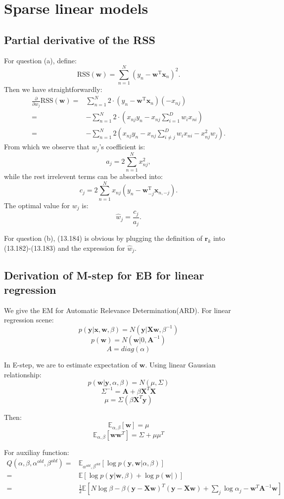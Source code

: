 \documentclass[UTF8]{ctexart}
\begin{document}
\newpage
\section{Sparse linear models}
\subsection{Partial derivative of the RSS}
For question (a), define:
$$\text{RSS}(\textbf{w})=\sum_{n=1}^{N}(y_{n}-\textbf{w}^{\text{T}}\textbf{x}_{n})^{2}.$$
Then we have straightforwardly:
\begin{align}
\frac{\partial}{\partial w_{j}}\text{RSS}(\textbf{w})=&\sum_{n=1}^{N}2\cdot(y_{n}-\textbf{w}^{\text{T}}\textbf{x}_{n})(-x_{nj})\nonumber \\
=&-\sum_{n=1}^{N}2\cdot(x_{nj}y_{n}-x_{nj}\sum_{i=1}^{D}w_{i}x_{ni})\nonumber \\
=&-\sum_{n=1}^{N}2(x_{nj}y_{n}-x_{nj}\sum_{i\neq j}^{D}w_{i}x_{ni}-x_{nj}^{2}w_{j}).\nonumber
\end{align}
From which we observe that $w_{j}$'s coefficient is:
$$a_{j}=2\sum_{n=1}^{N}x_{nj}^{2},$$
while the rest irrelevent terms can be absorbed into:
$$c_{j}=2\sum_{n=1}^{N}x_{nj}(y_{n}-\textbf{w}_{-j}^{\text{T}}\textbf{x}_{n,-j}).$$
The optimal value for $w_{j}$ is:
$$\hat{w}_{j}=\frac{c_{j}}{a_{j}}.$$

For question (b), (13.184) is obvious by plugging the definition of $\textbf{r}_{k}$ into (13.182)-(13.183) and the expression for $\hat{w}_{j}$.


\subsection{Derivation of M-step for EB for linear regression}
We give the EM for Automatic Relevance Determination(ARD). For linear regression scene:
$$p(\textbf{y}|\textbf{x},\textbf{w},\beta)=N(\textbf{y}|\textbf{X}\textbf{w},\beta^{-1})$$
$$p(\textbf{w})=N(\textbf{w}|0,\textbf{A}^{-1})$$
$$A=diag(\alpha)$$

In E-step, we are to estimate expectation of $\textbf{w}$. Using linear Gaussian relationship:
$$p(\textbf{w}|\textbf{y},\alpha,\beta)=N(\mu,\Sigma)$$
$$\Sigma^{-1}=\textbf{A}+\beta \textbf{X}^{T}\textbf{X}$$
$$\mu=\Sigma(\beta \textbf{X}^{T}\textbf{y})$$

Then:
$$\mathbb{E}_{\alpha,\beta}[\textbf{w}]=\mu$$
$$\mathbb{E}_{\alpha,\beta}[\textbf{w}\textbf{w}^{T}]=\Sigma+\mu\mu^{T}$$

For auxiliay function:
\begin{align}
Q(\alpha,\beta,\alpha^{old},\beta^{old})=&\mathbb{E}_{\alpha^{old},\beta^{old}}[\log p(\textbf{y},\textbf{w}|\alpha,\beta)]\nonumber \\
=&\mathbb{E}[\log p(\textbf{y}|\textbf{w},\beta) + \log p(\textbf{w}|)]\nonumber \\
=&\frac{1}{2}\mathbb{E}[N \log \beta -\beta (\textbf{y}-\textbf{X}\textbf{w})^{T}(\textbf{y}-\textbf{X}\textbf{w})+\sum_{j}\log \alpha_{j} - \textbf{w}^{T}\textbf{A}^{-1}\textbf{w}]\nonumber
\end{align}
\end{document}
